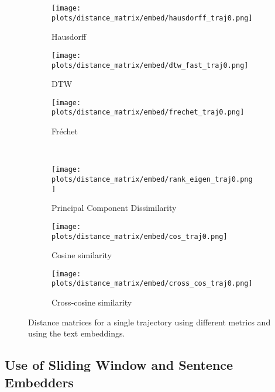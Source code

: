 \documentclass[a4paper,12pt]{article}
\begin{document}
\begin{figure}[H]
    \centering
    \begin{subfigure}[b]{0.32\textwidth}
        \centering
        \texttt{[image: plots/distance\_matrix/embed/hausdorff\_traj0.png]}
        \caption{Hausdorff}
    \end{subfigure}
    \begin{subfigure}[b]{0.32\textwidth}
        \centering
        \texttt{[image: plots/distance\_matrix/embed/dtw\_fast\_traj0.png]}
        \caption{DTW}
    \end{subfigure}
    \begin{subfigure}[b]{0.32\textwidth}
        \centering
        \texttt{[image: plots/distance\_matrix/embed/frechet\_traj0.png]}
        \caption{Fréchet}
    \end{subfigure}
    \\[0.5em]
    \begin{subfigure}[b]{0.32\textwidth}
        \centering
        \texttt{[image: plots/distance\_matrix/embed/rank\_eigen\_traj0.png]}
        \caption{Principal Component Dissimilarity}
    \end{subfigure}
    \begin{subfigure}[b]{0.32\textwidth}
        \centering
        \texttt{[image: plots/distance\_matrix/embed/cos\_traj0.png]}
        \caption{Cosine similarity}
    \end{subfigure}
    \begin{subfigure}[b]{0.32\textwidth}
        \centering
        \texttt{[image: plots/distance\_matrix/embed/cross\_cos\_traj0.png]}
        \caption{Cross-cosine similarity}
    \end{subfigure}
    \caption{Distance matrices for a single trajectory using different metrics and using the text embeddings.}
    \label{fig:distance_metrics_comparison_embed}
\end{figure}



\subsection{Use of Sliding Window and Sentence Embedders  }
\label{subsec:sliding_window}
\end{document}
